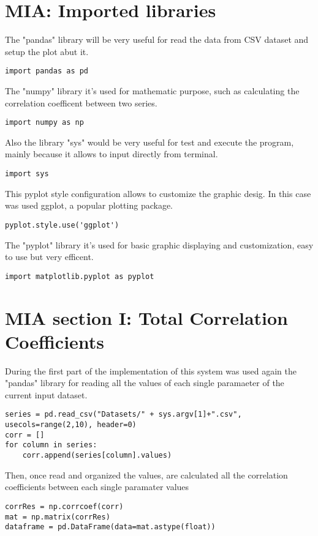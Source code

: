 \label{MIA_Implementation}
\section{MIA: Imported libraries}
\label{MIA_Libraries}
The "pandas" library will be very useful for read the data from CSV dataset and setup the plot abut it.
\begin{lstlisting}
import pandas as pd
\end{lstlisting}

The "numpy" library it's used for mathematic purpose, such as calculating the correlation coefficent between two series.
\begin{lstlisting}
import numpy as np
\end{lstlisting}

Also the library "sys" would be very useful for test and execute the program, mainly because it allows to input directly from terminal.
\begin{lstlisting}
import sys
\end{lstlisting}

This pyplot style configuration allows to customize the graphic desig. In this case was used ggplot, a popular plotting package.
\begin{lstlisting}
pyplot.style.use('ggplot')
\end{lstlisting}
 
The "pyplot" library it's used for basic graphic displaying and customization, easy to use but very efficent.
\begin{lstlisting}
import matplotlib.pyplot as pyplot
\end{lstlisting}

\section{MIA section I: Total Correlation Coefficients}
\label{MIA_section_I}

During the first part of the implementation of this system was used again the "pandas" library for reading all the values of each single paramaeter of the current input dataset.
\begin{lstlisting}
series = pd.read_csv("Datasets/" + sys.argv[1]+".csv", usecols=range(2,10), header=0)
corr = []
for column in series:
    corr.append(series[column].values)
\end{lstlisting} 

Then, once read and organized the values, are calculated all the correlation coefficients between each single paramater values
\begin{lstlisting}
corrRes = np.corrcoef(corr)
mat = np.matrix(corrRes)
dataframe = pd.DataFrame(data=mat.astype(float))
\end{lstlisting} 

